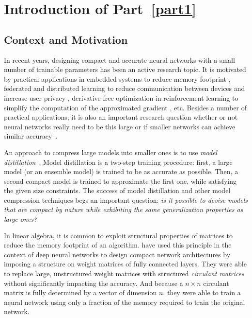\chapter{Introduction of Part~\ref{part1}}
\label{chapter:p1-ch2-introduction}
\localtableofcontents

\section{Context and Motivation}
\label{section:p1-ch2-context_and_motivation}

In recent years, designing compact and accurate neural networks with a small number of trainable parameters has been an active research topic.
It is motivated by practical applications in embedded systems to reduce memory footprint \cite{sainath2015convolutional}, federated and distributed learning to reduce communication between devices and increase user privacy \cite{konecny2016federated}, derivative-free optimization in reinforcement learning to simplify the computation of the approximated gradient \cite{choromanski2018structured}, etc.
Besides a number of practical applications, it is also an important research question whether or not neural networks really need to be this large or if smaller networks can achieve similar accuracy~\cite{ba2014deep}.

An approach to compress large models into smaller ones is to use \emph{model distillation}~\cite{hinton2015distilling}.
Model distillation is a two-step training procedure: first, a large model (or an ensemble model) is trained to be as accurate as possible.
Then, a second compact model is trained to approximate the first one, while satisfying the given size constraints.
The success of model distillation and other model compression techniques begs an important question: \emph{is it possible to devise models that are compact by nature while exhibiting the same generalization properties as large ones?}

In linear algebra, it is common to exploit structural properties of matrices to reduce the memory footprint of an algorithm. 
\citet{cheng2015exploration} have used this principle in the context of deep neural networks to design compact network architectures by imposing a structure on weight matrices of fully connected layers.
They were able to replace large, unstructured weight matrices with structured \emph{circulant matrices} without significantly impacting the accuracy.
And because a $n \times n$ circulant matrix is fully determined by a vector of dimension $n$, they were able to train a neural network using only a fraction of the memory required to train the original network.

